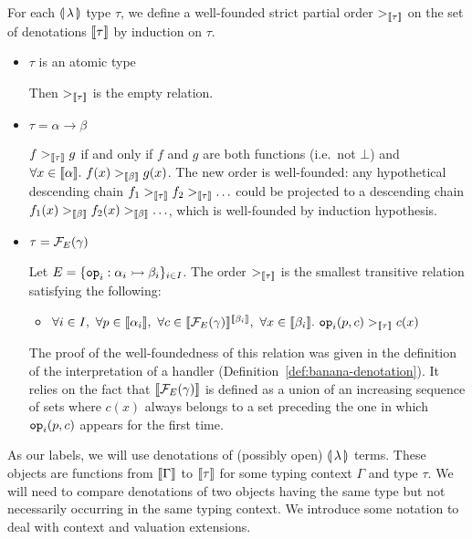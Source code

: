 \begin{definition}\label{def:order-on-denotations}
  For each $\llparenthesis \, \lambda \, \rrparenthesis$ type $\tau$, we define a well-founded strict
  partial order $>_{\llbracket \tau \rrbracket}$ on the set of denotations $\llbracket \tau \rrbracket$ by
  induction on $\tau$.

  \begin{itemize}
  \item $\tau$ is an atomic type

    Then $>_{\llbracket \tau \rrbracket}$ is the empty relation.

  \item $\tau = \alpha \to \beta$

    $f >_{\llbracket \tau \rrbracket} g$ if and only if $f$ and $g$ are both functions
    (i.e.\ not $\bot$) and
    $\forall x \in \llbracket \alpha \rrbracket.\ f(x) >_{\llbracket \beta \rrbracket} g(x)$. The new order
    is well-founded: any hypothetical descending chain
    $f_1 >_{\llbracket \tau \rrbracket} f_2 >_{\llbracket \tau \rrbracket} \ldots$ could be projected to a
    descending chain
    $f_1(x) >_{\llbracket \beta \rrbracket} f_2(x) >_{\llbracket \beta \rrbracket} \ldots$, which is
    well-founded by induction hypothesis.

  \item $\tau = \mathcal{F}_E(\gamma)$

    Let $E = \{\mathtt{op}_i : \alpha_i \rightarrowtail \beta_i\}_{i \in I}$. The
    order $>_{\llbracket \tau \rrbracket}$ is the smallest transitive relation satisfying
    the following:
    \begin{itemize}
    \item
      $\forall i \in I,\ \forall p \in \llbracket \alpha_i \rrbracket,\ \forall c \in
      \llbracket \mathcal{F}_E(\gamma) \rrbracket^{\llbracket \beta_i \rrbracket},\ \forall x \in \llbracket \beta_i \rrbracket.\
      \mathtt{op}_i(p, c) >_{\llbracket \tau \rrbracket} c(x)$
    \end{itemize}
    
    The proof of the well-foundedness of this relation was given in the
    definition of the interpretation of a handler
    (Definition~\ref{def:banana-denotation}). It relies on the fact that
    $\llbracket \mathcal{F}_E(\gamma) \rrbracket$ is defined as a union of an increasing sequence
    of sets where $c(x)$ always belongs to a set preceding the one in which
    $\mathtt{op}_i(p, c)$ appears for the first time.
  \end{itemize}
\end{definition}

As our labels, we will use denotations of (possibly open)
$\llparenthesis \, \lambda \, \rrparenthesis$ terms. These objects are functions from $\llbracket \Gamma \rrbracket$
to $\llbracket \tau \rrbracket$ for some typing context $\Gamma$ and type $\tau$. We will
need to compare denotations of two objects having the same type but not
necessarily occurring in the same typing context. We introduce some
notation to deal with context and valuation extensions.

